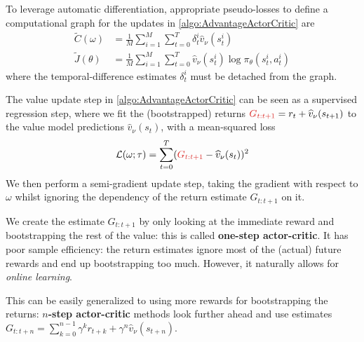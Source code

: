 \documentclass[../course-notes.tex]{subfiles}
\begin{document}
\begin{remark}
	To leverage automatic differentiation, appropriate pseudo-losses to define a computational graph for the updates in \cref{algo:AdvantageActorCritic} are
	\begin{subequations}
		\begin{align}
		\tilde{C}(\omega) &= \frac{1}{M}\sum_{i=1}^M
		\sum_{t=0}^T\delta^i_t  \widehat{v}_\nu(s^i_t)  \\
		\tilde{J}(\theta) &=
		\frac{1}{M}\sum_{i=1}^M
		\sum_{t=0}^T \widehat{v}_\nu(s^i_t) \log\pi_\theta(s^i_t,a^i_t)
		\end{align}
	\end{subequations}
	where the temporal-difference estimates $\delta^i_t$ must be detached from the graph.
\end{remark}


The value update step in \cref{algo:AdvantageActorCritic} can be seen as a supervised regression step, where we fit the (bootstrapped) returns ${\redfont G_{t:t+1}} = r_t + \widehat{v}_\nu(s_{t+1})$ to the value model predictions $\widehat{v}_\nu(s_t)$, with a mean-squared loss
\[
\calL(\omega; \tau) =
\sum_{t=0}^T ({\redfont G_{t:t+1}} - \widehat{v}_{\nu}(s_t))^2
\]
We then perform a semi-gradient update step, taking the gradient with respect to $\omega$ whilst ignoring the dependency of the return estimate $G_{t:t+1}$ on it.

We create the estimate $G_{t:t+1}$ by only looking at the immediate reward and bootstrapping the rest of the value: this is called \textbf{one-step actor-critic}. It has poor sample efficiency: the return estimates ignore most of the (actual) future rewards and end up bootstrapping too much. However, it naturally allows for \textit{online learning}.	

This can be easily generalized to using more rewards for bootstrapping the returns: \textbf{$n$-step actor-critic} methods look further ahead and use estimates $G_{t:t+n} = \sum_{k=0}^{n-1}\gamma^k r_{t+k} + \gamma^n \widehat{v}_\nu(s_{t+n})$.
\end{document}
